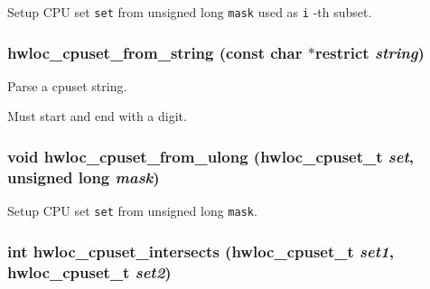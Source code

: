 Setup CPU set {\tt set} from unsigned long {\tt mask} used as {\tt i} -th subset. 

\hypertarget{group__hwlocality__cpuset_g63e62db35640c1b90684952d7a3b5175}{
\subsubsection[{hwloc\_\-cpuset\_\-from\_\-string}]{ hwloc\_\-cpuset\_\-from\_\-string (const char $\ast$restrict {\em string})}}
\label{group__hwlocality__cpuset_g63e62db35640c1b90684952d7a3b5175}


Parse a cpuset string. 

Must start and end with a digit. \hypertarget{group__hwlocality__cpuset_g1dbccf3bbf6e6ec0464bfd9e4d47e5cb}{
\subsubsection[{hwloc\_\-cpuset\_\-from\_\-ulong}]{\setlength{\rightskip}{0pt plus 5cm}void hwloc\_\-cpuset\_\-from\_\-ulong ({\bf hwloc\_\-cpuset\_\-t} {\em set}, \/  unsigned long {\em mask})}}
\label{group__hwlocality__cpuset_g1dbccf3bbf6e6ec0464bfd9e4d47e5cb}


Setup CPU set {\tt set} from unsigned long {\tt mask}. 

\hypertarget{group__hwlocality__cpuset_g009c89c43c86ece327df0ee4cf54f3a7}{
\subsubsection[{hwloc\_\-cpuset\_\-intersects}]{\setlength{\rightskip}{0pt plus 5cm}int hwloc\_\-cpuset\_\-intersects ({\bf hwloc\_\-cpuset\_\-t} {\em set1}, \/  {\bf hwloc\_\-cpuset\_\-t} {\em set2})}}
\label{group__hwlocality__cpuset_g009c89c43c86ece327df0ee4cf54f3a7}



